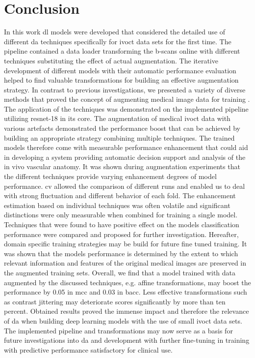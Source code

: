 
\chapter{Conclusion}

In this work \acrshort{dl} models were developed that considered the detailed use of different \acrshort{da} techniques specifically for \acrshort{ivoct} data sets for the first time. The pipeline contained a data loader transforming the \glspl{b-scan} online with different techniques substituting the effect of actual augmentation. The iterative development of different models with their automatic performance evaluation helped to find valuable transformations for building an effective augmentation strategy. In contrast to previous investigations, we presented a variety of diverse methods that proved the concept of augmenting medical image data for training . The application of the techniques was demonstrated on the implemented pipeline utilizing \acrshort{resnet}-18 in its core. The augmentation of medical \acrshort{ivoct} data with various artefacts demonstrated the performance boost that can be achieved by building an appropriate strategy combining multiple techniques. The trained models therefore come with measurable performance enhancement that could aid in developing a system providing automatic decision support and analysis of the in vivo vascular anatomy. It was shown during augmentation experiments that the different techniques provide varying enhancement degrees of model performance. \Acrshort{cv} allowed the comparison of different runs and enabled us to deal with strong fluctuation and different behavior of each fold. The enhancement estimation based on individual techniques was often volatile and significant distinctions were only measurable when combined for training a single model. Techniques that were found to have positive effect on the models classification performance were compared and proposed for further investigation. Hereafter, domain specific training strategies may be build for future fine tuned training. It was shown that the models performance is determined by the extent to which relevant information and features of the original medical images are preserved in the augmented training sets. Overall, we find that a model trained with data augmented by the discussed techniques, e.g. affine transformations, may boost the performance by 0.05 in \acrfull{mcc} and 0.03 in \acrfull{bacc}. Less effective transformations such as contrast jittering may deteriorate scores significantly by more than ten percent. Obtained results proved the immense impact and therefore the relevance of \acrshort{da} when building deep learning models with the use of small \acrshort{ivoct} data sets. The implemented pipeline and transformations may now serve as a basis for future investigations into \acrshort{da} and development with further fine-tuning in training with predictive performance satisfactory for clinical use.



